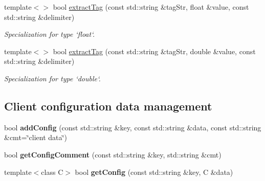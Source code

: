 \begin{CompactItemize}
template$<$$>$ bool \hyperlink{namespaceConfiguration_bdc6610189d8622499b18cf9dd955e01}{extract\-Tag} (const std::string \&tag\-Str, float \&value, const std::string \&delimiter)
\begin{CompactList}\small\item\em Specialization for type `float`. \item\end{CompactList}\item 
template$<$$>$ bool \hyperlink{namespaceConfiguration_39f1934324f5782301ac4372c970bbd7}{extract\-Tag} (const std::string \&tag\-Str, double \&value, const std::string \&delimiter)
\begin{CompactList}\small\item\em Specialization for type `double`. \item\end{CompactList}\end{CompactItemize}
\subsection*{Client configuration data management}
\begin{CompactItemize}
\item 
\hypertarget{namespaceConfiguration_98b61fda0256fa043e2223c21c9cc363}{
bool \textbf{add\-Config} (const std::string \&key, const std::string \&data, const std::string \&cmt=\char`\"{}client data\char`\"{})}
\label{namespaceConfiguration_98b61fda0256fa043e2223c21c9cc363}

\item 
\hypertarget{namespaceConfiguration_474c462cac1b9fc3dfede75058ee88db}{
bool \textbf{get\-Config\-Comment} (const std::string \&key, std::string \&cmt)}
\label{namespaceConfiguration_474c462cac1b9fc3dfede75058ee88db}

\item 
\hypertarget{namespaceConfiguration_3983f50cada1abb506444079e9f6c568}{
template$<$class C$>$ bool \textbf{get\-Config} (const std::string \&key, C \&data)}
\label{namespaceConfiguration_3983f50cada1abb506444079e9f6c568}

\end{CompactItemize}
